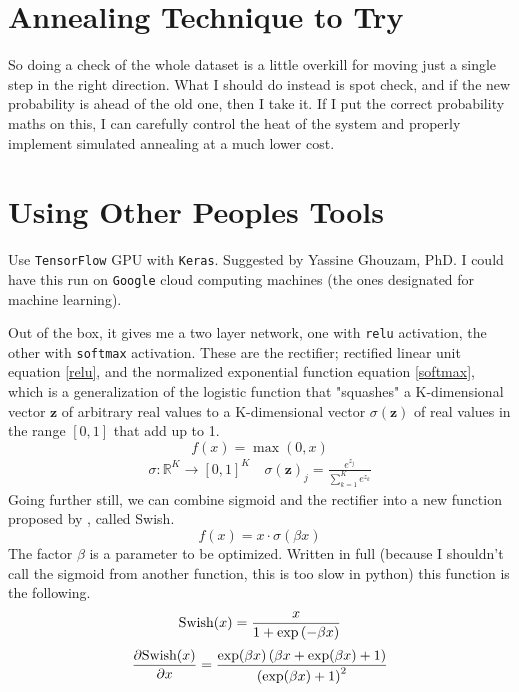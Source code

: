 \documentclass[a4paper,12pt]{report}
\begin{document}
\section{Annealing Technique to Try}
So doing a check of the whole dataset is a little overkill for moving just a single step in the right direction. What I should do instead is spot check, and if the new probability is ahead of the old one, then I take it. If I put the correct probability maths on this, I can carefully control the heat of the system and properly implement simulated annealing at a much lower cost.
\section{Using Other Peoples Tools}
Use \texttt{TensorFlow} GPU with \texttt{Keras}. Suggested by Yassine Ghouzam, PhD.
I could have this run on \texttt{Google} cloud computing machines (the ones designated for machine learning). 

Out of the box, it gives me a two layer network, one with \texttt{relu} activation, the other with \texttt{softmax} activation.
These are the rectifier; rectified linear unit equation \ref{relu}, and the normalized exponential function equation \ref{softmax}, which is a generalization of the logistic function that "squashes" a K-dimensional vector $\boldsymbol{z}$  of arbitrary real values to a K-dimensional vector $\sigma (\boldsymbol{z} )$ of real values in the range $[0, 1]$ that add up to 1.
\begin{equation} \label{relu}
	f(x) = \max \left(0, x\right)
\end{equation}
\begin{align} \label{softmax}
\sigma:\mathbb{R}^K \to [0,1]^K \quad
\sigma(\boldsymbol{z})_j = \frac{e^{z_j}}{\sum_{k=1}^K e^{z_k}}
\end{align}
Going further still, we can combine sigmoid and the rectifier into a new function proposed by \cite{swish}, called Swish.
\begin{equation} \label{swish}
f(x) = x \cdot \sigma(\beta x)
\end{equation}
The factor $\beta$ is a parameter to be optimized. Written in full (because I shouldn't call the sigmoid from another function, this is too slow in python) this function is the following.
\begin{equation} \label{swishLong}
\textup{Swish}(x) = \frac{x}{1+\exp \left(-\beta x\right)}
\end{equation}
\begin{equation} \label{swishLongDerivative}
\frac{\partial \textup{Swish}(x)}{\partial x} = \frac{\exp(\beta x)\left( \beta x + \exp (\beta x) + 1\right)}{\left(\exp(\beta x) + 1\right)^2}
\end{equation}
{}
\end{document}
